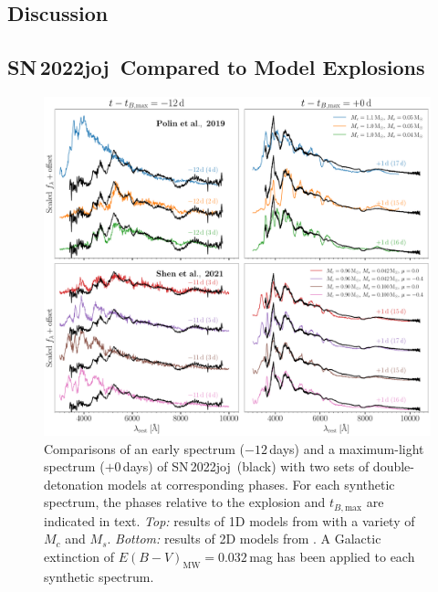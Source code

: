 \documentclass[twocolumn]{aastex631}
\newcommand{\sn}{SN\,2022joj}
\begin{document}
\begin{CJK*}{UTF8}{gbsn}
\section{Discussion} \label{sec:discussion}
\subsection{\sn\ Compared to Model Explosions} \label{sec:model}

\begin{figure}
    \centering
    \includegraphics[width=\linewidth]{model_comparison_spec.pdf}
    \caption{Comparisons of an early spectrum ($-12$\,days) and a maximum-light spectrum ($+0$\,days) of \sn\ (black) with two sets of double-detonation models at corresponding phases. For each synthetic spectrum, the phases relative to the explosion and $t_{B,\mathrm{max}}$ are indicated in text. \textit{Top:} results of 1D models from \citet{polin_observational_2019} with a variety of $M_c$ and $M_s$. \textit{Bottom:} results of 2D models from \citet{Shen_2D_2021}. A Galactic extinction of ${E(B-V)_\mathrm{MW}}=0.032$\,mag has been applied to each synthetic spectrum.}
    \label{fig:model_spec}
\end{figure}


\end{CJK*}
\end{document}
